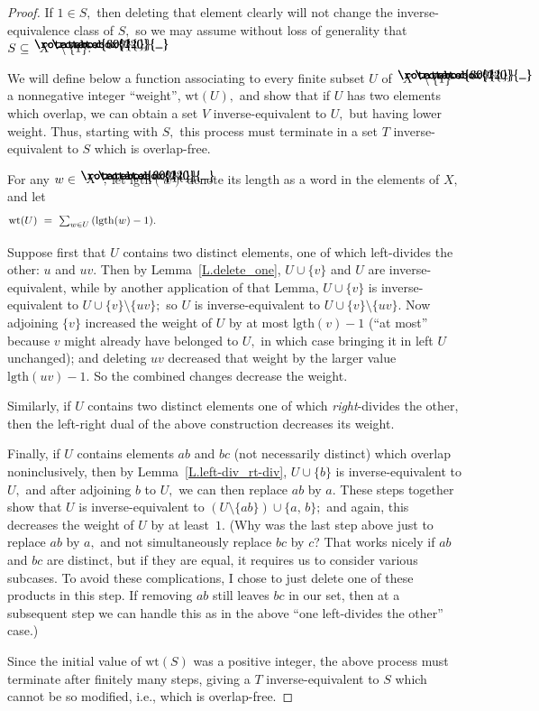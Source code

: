 \documentclass{amsart}
\numberwithin{equation}{section}
\renewcommand{\r}{\mathrm}
\newcommand{\langl}{\begin{picture}(.51em,1em)
\put(.11em,.33em){\rotatebox{60}{\line(1,0){.55em}}}
\put(.11em,.33em){\rotatebox{300}{\line(1,0){.55em}}}
\end{picture}}
\newcommand{\rangl}{\begin{picture}(.5em,1em)
\put(.09em,.33em){\rotatebox{120}{\line(1,0){.55em}}}
\put(.09em,.33em){\rotatebox{240}{\line(1,0){.55em}}}
\end{picture}}
\begin{document}
\begin{proof}
If $1\in S,$ then deleting that element clearly will not change
the inverse-equivalence class of $S,$ so we may assume without loss
of generality that $S\subseteq\langl X\rangl\setminus\{1\}.$

We will define below a function associating to every finite
subset $U$ of $\langl X\rangl\setminus\{1\}$ a nonnegative
integer ``weight'', $\mathrm{wt}(U),$ and show that
if $U$ has two elements which overlap, we can obtain
a set $V$ inverse-equivalent to $U,$ but having lower weight.
Thus, starting with $S,$ this process must terminate in a set $T$
inverse-equivalent to $S$ which is overlap-free.

For any $w\in \langl X\rangl,$ let
$\mathrm{lgth}(w)$ denote its length
as a word in the elements of $X,$ and let
%
\begin{equation}\begin{minipage}[c]{35pc}\label{d.wt=}
$\mathrm{wt}(U) \ = \ \sum_{w\in U}\,(\r{lgth}(w)-1).$
\end{minipage}\end{equation}

Suppose first that $U$ contains two distinct
elements, one of which left-divides the other: $u$ and $uv.$
Then by Lemma~\ref{L.delete_one},
$U\cup\{v\}$ and $U$ are inverse-equivalent, while by another
application of that Lemma, $U\cup \{v\}$ is inverse-equivalent
to $U\cup\{v\}\setminus\{uv\};$
so $U$ is inverse-equivalent to $U\cup \{v\} \setminus\{uv\}.$
Now adjoining $\{v\}$ increased the weight of $U$
by at most $\mathrm{lgth}(v)-1$ (``at most'' because $v$ might
already have belonged to $U,$ in which case bringing it in
left $U$ unchanged); and deleting $uv$ decreased
that weight by the larger value $\mathrm{lgth}(uv)-1.$
So the combined changes decrease the weight.

Similarly, if $U$ contains two distinct elements one of which
{\em right}-divides the other, then the left-right dual of the
above construction decreases its weight.

Finally, if $U$ contains elements $ab$ and $bc$
(not necessarily distinct) which
overlap noninclusively, then by Lemma~\ref{L.left-div_rt-div},
$U\cup\{b\}$ is inverse-equivalent to $U,$ and after
adjoining $b$ to $U,$ we can then replace $ab$ by $a.$
These steps together show that $U$ is inverse-equivalent to
$(U\setminus\{ab\})\cup\{a,\,b\};$ and again, this decreases
the weight of $U$ by at least~$1.$
(Why was the last step above just to
replace $ab$ by $a,$ and not simultaneously replace $bc$ by $c$?
That works nicely if $ab$ and $bc$ are distinct, but if they are equal,
it requires us to consider various subcases.
To avoid these complications, I chose to just delete
one of these products in this step.
If removing $ab$ still leaves $bc$ in our set, then at a subsequent
step we can handle this as in the above
``one left-divides the other'' case.)

Since the initial value of $\mathrm{wt}(S)$ was a positive
integer, the above process must terminate after
finitely many steps, giving a $T$
inverse-equivalent to $S$ which cannot be
so modified, i.e., which is overlap-free.
\end{proof}
\end{document}
